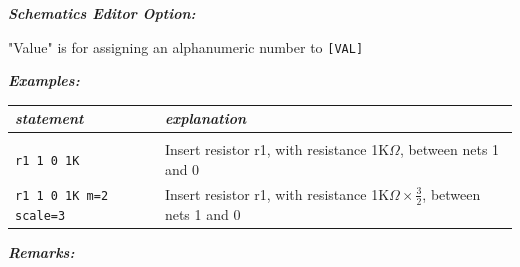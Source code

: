 \textbf{\textit{Schematics Editor Option:}}

"\textsf{Value}" is for assigning an alphanumeric number to \texttt{[VAL]}

\textbf{\textit{Examples:}}

\begin{longtable}{l l}
\textit{statement} & \textit{explanation} \\ \hline \\ \vspace{-0.8\parskip} 
\texttt{r1 1 0 1K} & {\small Insert resistor r1, with resistance 1K$\Omega$, between nets 1 and 0} \\
\texttt{r1 1 0 1K m=2 scale=3} & {\small Insert resistor r1, with resistance 1K$\Omega \times \frac{3}{2}$, between nets 1 and 0}
\end{longtable}

\textbf{\textit{Remarks:}}

